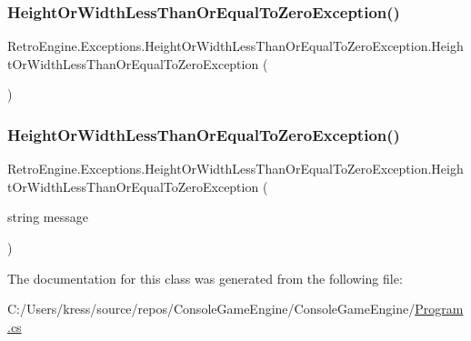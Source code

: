 \subsubsection{\texorpdfstring{HeightOrWidthLessThanOrEqualToZeroException()}{HeightOrWidthLessThanOrEqualToZeroException()}\hspace{0.1cm}{\footnotesize\ttfamily [1/2]}}
{\footnotesize\ttfamily Retro\+Engine.\+Exceptions.\+Height\+Or\+Width\+Less\+Than\+Or\+Equal\+To\+Zero\+Exception.\+Height\+Or\+Width\+Less\+Than\+Or\+Equal\+To\+Zero\+Exception (\begin{DoxyParamCaption}{ }\end{DoxyParamCaption})}

\mbox{\label{class_retro_engine_1_1_exceptions_1_1_height_or_width_less_than_or_equal_to_zero_exception_a0dd328d283661af035a883be73fe78bc}} 
\subsubsection{\texorpdfstring{HeightOrWidthLessThanOrEqualToZeroException()}{HeightOrWidthLessThanOrEqualToZeroException()}\hspace{0.1cm}{\footnotesize\ttfamily [2/2]}}
{\footnotesize\ttfamily Retro\+Engine.\+Exceptions.\+Height\+Or\+Width\+Less\+Than\+Or\+Equal\+To\+Zero\+Exception.\+Height\+Or\+Width\+Less\+Than\+Or\+Equal\+To\+Zero\+Exception (\begin{DoxyParamCaption}\item[{string}]{message }\end{DoxyParamCaption})}



The documentation for this class was generated from the following file\+:\begin{DoxyCompactItemize}
\item 
C\+:/\+Users/kress/source/repos/\+Console\+Game\+Engine/\+Console\+Game\+Engine/\mbox{\hyperlink{_program_8cs}{Program.\+cs}}\end{DoxyCompactItemize}
